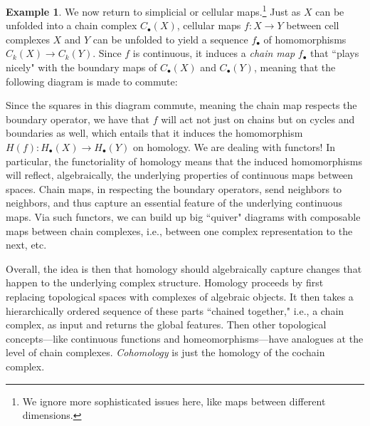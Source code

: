 \documentclass[a4paper]{book}
\theoremstyle{definition}
\newtheorem{example}{Example}[section]
\theoremstyle{definition}
\theoremstyle{definition}
\theoremstyle{theorem}
\theoremstyle{definition}
\begin{document}
\begin{example}
	We now return to simplicial or cellular maps.\footnote{We ignore more sophisticated issues here, like maps between different dimensions.} Just as $X$ can be unfolded into a chain complex $C_{\bullet}(X)$, cellular maps $f: X \rightarrow Y$ between cell complexes $X$ and $Y$ can be unfolded to yield a sequence $f_{\bullet}$ of homomorphisms $C_k(X) \rightarrow C_k(Y)$. Since $f$ is continuous, it induces a \textit{chain map} $f_{\bullet}$ that ``plays nicely" with the boundary maps of $C_{\bullet}(X)$ and $C_{\bullet}(Y)$, meaning that the following diagram is made to commute:
	\begin{center}  
	\end{center} 
	Since the squares in this diagram commute, meaning the chain map respects the boundary operator, we have that $f$ will act not just on chains but on cycles and boundaries as well, which entails that it induces the homomorphism $H(f): H_{\bullet}(X) \rightarrow H_{\bullet}(Y)$ on homology. We are dealing with functors! In particular, the functoriality of homology means that the induced homomorphisms will reflect, algebraically, the underlying properties of continuous maps between spaces. Chain maps, in respecting the boundary operators, send neighbors to neighbors, and thus capture an essential feature of the underlying continuous maps. Via such functors, we can build up big ``quiver" diagrams with composable maps between chain complexes, i.e., between one complex representation to the next, etc. \par 
	 	Overall, the idea is then that homology should algebraically capture changes that happen to the underlying complex structure. Homology proceeds by first replacing topological spaces with complexes of algebraic objects. It then takes a hierarchically ordered sequence of these parts ``chained together," i.e., a chain complex, as input and returns the global features. Then other topological concepts---like continuous functions and homeomorphisms---have analogues at the level of chain complexes. \textit{Cohomology} is just the homology of the cochain complex.\par 

\end{example}
\end{document}
